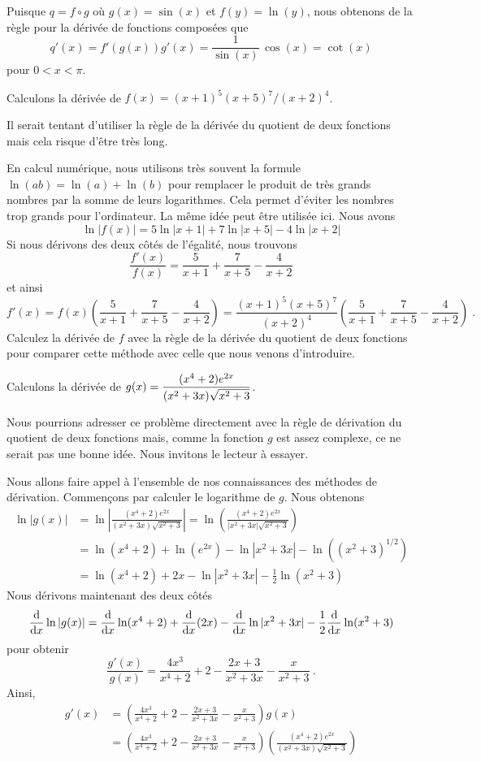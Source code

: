 {\begin{egg}
Puisque $q = f\circ g$ où $g(x) = \sin(x)$ et $f(y) = \ln(y)$, nous
obtenons de la règle pour la dérivée de fonctions composées que
\[
q'(x) = f'(g(x)) g'(x) = \frac{1}{\sin(x)} \, \cos(x)
= \cot(x)
\]
pour $0 < x < \pi$.
\end{egg}

\begin{egg}
Calculons la dérivée de $f(x) = (x+1)^5(x+5)^7/(x+2)^4$.

Il serait tentant d'utiliser la règle de la dérivée du quotient de
deux fonctions mais cela risque d'être très long.

En calcul numérique, nous utilisons très souvent la formule
$\ln(ab) = \ln(a)+\ln(b)$ pour remplacer le produit de très
grands nombres par la somme de leurs logarithmes.  Cela permet
d'éviter les nombres trop grands pour l'ordinateur.
La même idée peut être utilisée ici.  Nous avons
\[
\ln|f(x)| = 5\ln|x+1| + 7\ln|x+5| - 4\ln|x+2|
\]
Si nous dérivons des deux côtés de l'égalité, nous trouvons
\[
\frac{f'(x)}{f(x)} = \frac{5}{x+1} + \frac{7}{x+5} - \frac{4}{x+2}
\]
et ainsi
\[
f'(x) = f(x) \left(\frac{5}{x+1} + \frac{7}{x+5} - \frac{4}{x+2} \right)
= \frac{(x+1)^5(x+5)^7}{(x+2)^4}
\left(\frac{5}{x+1} + \frac{7}{x+5} - \frac{4}{x+2} \right) \; .
\]
Calculez la dérivée de $f$ avec la règle de la dérivée du quotient de
deux fonctions pour comparer cette méthode avec celle que nous venons
d'introduire.
\end{egg}

\begin{egg}
Calculons la dérivée de
$\DS g(x) = \frac{(x^4+2)e^{2x}}{(x^2+3x)\sqrt{x^2+3}}$.

Nous pourrions adresser ce problème directement avec la règle de
dérivation du quotient de deux fonctions mais, comme la fonction $g$
est assez complexe, ce ne serait pas une bonne idée.  Nous invitons le
lecteur à essayer.

Nous allons faire appel à l'ensemble de nos connaissances des méthodes de
dérivation.  Commençons par calculer le logarithme de $g$.  Nous
obtenons
\begin{align*}
\ln|g(x)| &= \ln\left|\frac{(x^4+2)e^{2x}}{(x^2+3x)\sqrt{x^2+3}}\right|
= \ln\left(\frac{(x^4+2)e^{2x}}{|x^2+3x|\sqrt{x^2+3}}\right) \\
& = \ln(x^4+2) + \ln(e^{2x}) - \ln|x^2+3x| - \ln\left((x^2+3)^{1/2}\right) \\
& = \ln(x^4+2) + 2x - \ln|x^2+3x| -\frac{1}{2} \ln(x^2+3)
\end{align*}
Nous dérivons maintenant des deux côtés
\[
\dfdx{\ln|g(x)|}{x} = \dfdx{\ln(x^4+2)}{x} + \dfdx{(2x)}{x} -
\dfdx{\ln|x^2+3x|}{x} -\frac{1}{2} \dfdx{\ln(x^2+3)}{x}
\]
pour obtenir
\[
\frac{g'(x)}{g(x)} = \frac{4x^3}{x^4+2} + 2 -
\frac{2x + 3}{x^2+3x} - \frac{x}{x^2+3} \ .
\]
Ainsi,
\begin{align*}
g'(x) &= \left(\frac{4x^3}{x^4+2} + 2 -
\frac{2x + 3}{x^2+3x} - \frac{x}{x^2+3}\right) g(x) \\
&= \left(\frac{4x^3}{x^4+2} + 2 -
\frac{2x + 3}{x^2+3x} - \frac{x}{x^2+3}\right)
\left(\frac{(x^4+2)e^{2x}}{(x^2+3x)\sqrt{x^2+3}}\right)
\end{align*}
\end{egg}

}
